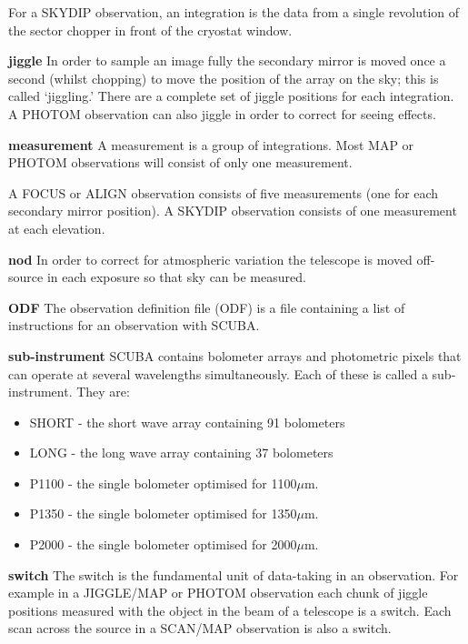 \documentclass[twoside,11pt]{article}
\newcommand{\micron}           {$\mu$m}
\renewcommand{\_}{\texttt{\symbol{95}}}
\begin{document}
\begin{description}
For a SKYDIP observation, an integration is the data from a single revolution
of the sector chopper in front of the cryostat window.


\item{{\bf jiggle}} In order to sample an image fully the secondary mirror
is moved once a second (whilst chopping) to move the position of the array on
the sky; this is called `jiggling.'  There are a  complete set of jiggle
positions for each integration. A PHOTOM observation can also jiggle in order
to correct for seeing effects.

\item{{\bf measurement}} A measurement is a group of integrations. Most MAP or
PHOTOM observations will consist of only one measurement.

A FOCUS or ALIGN observation consists of five measurements (one for each
secondary mirror position). A SKYDIP observation consists of one measurement
at each elevation.

\item{{\bf nod}} In order to correct for atmospheric variation the telescope
is moved off-source in each exposure so that sky can be measured.

\item{{\bf ODF}} The observation definition file (ODF) is a file containing a
list of instructions for an observation with SCUBA.

\item{{\bf sub-instrument}} SCUBA contains bolometer arrays and photometric
pixels that can operate at several wavelengths simultaneously. Each of these
is called a sub-instrument. They are:

\begin{itemize}
\item SHORT - the short wave array containing 91 bolometers
\item LONG - the long wave array containing 37 bolometers
\item P1100 - the single bolometer optimised for 1100\micron.
\item P1350 - the single bolometer optimised for 1350\micron.
\item P2000 - the single bolometer optimised for 2000\micron.
\end{itemize}


\item{{\bf switch}} The switch is the fundamental unit of data-taking in an
observation. For example in a JIGGLE/MAP or PHOTOM observation each chunk of
jiggle positions measured with the object in the beam of a telescope is a
switch. Each scan across the source in a SCAN/MAP observation is also a switch.
 

\end{description}
\end{document}
